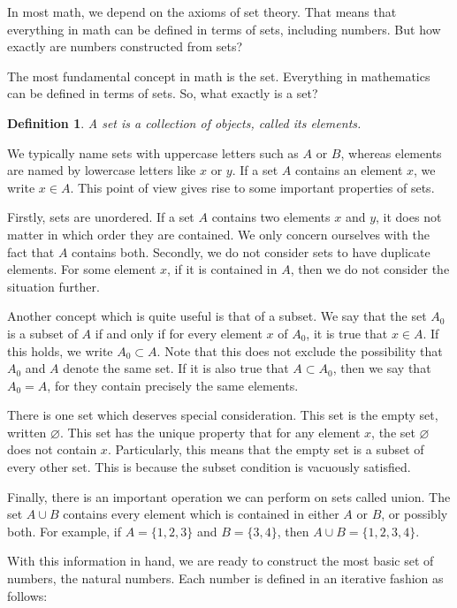 \documentclass[12pt]{article}
\newtheorem{definition}{Definition}
\begin{document}
In most math, we depend on the axioms of set theory. That means that everything
in math can be defined in terms of sets, including numbers. But how exactly are
numbers constructed from sets?

The most fundamental concept in math is the set. Everything in mathematics can
be defined in terms of sets. So, what exactly is a set?

\begin{definition}
  A set is a collection of objects, called its elements.
\end{definition}

We typically name sets with uppercase letters such as \(A\) or \(B\), whereas
elements are named by lowercase letters like \(x\) or \(y\). If a set \(A\)
contains an element \(x\), we write \(x \in A\). This point of view gives rise
to some important properties of sets.

Firstly, sets are unordered. If a set \(A\) contains two elements \(x\) and
\(y\), it does not matter in which order they are contained. We only concern
ourselves with the fact that \(A\) contains both. Secondly, we do not consider
sets to have duplicate elements. For some element \(x\), if it is contained in
\(A\), then we do not consider the situation further.

Another concept which is quite useful is that of a subset. We say that the set
\(A_0\) is a subset of \(A\) if and only if for every element \(x\) of \(A_0\),
it is true that \(x \in A\). If this holds, we write \(A_0 \subset A\). Note
that this does not exclude the possibility that \(A_0\) and \(A\) denote the
same set. If it is also true that \(A \subset A_0\), then we say that \(A_0 =
A\), for they contain precisely the same elements.

There is one set which deserves special consideration. This set is the empty
set, written \(\varnothing\). This set has the unique property that for any
element \(x\), the set \(\varnothing\) does not contain \(x\). Particularly,
this means that the empty set is a subset of every other set. This is because
the subset condition is vacuously satisfied.

Finally, there is an important operation we can perform on sets called union.
The set \(A \cup B\) contains every element which is contained in either \(A\)
or \(B\), or possibly both. For example, if \(A = \{1, 2, 3\}\) and \(B = \{3,
4\}\), then \(A \cup B = \{1, 2, 3, 4\}\).

With this information in hand, we are ready to construct the most basic set of
numbers, the natural numbers. Each number is defined in an iterative fashion as
follows:
\end{document}
